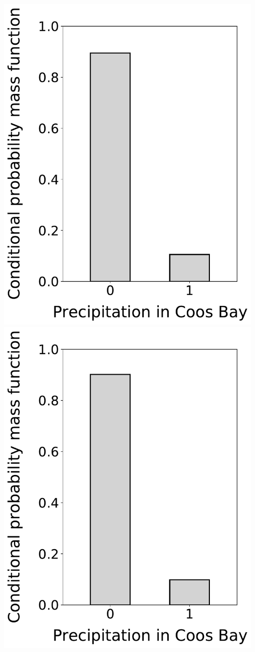 \documentclass[12pt,twoside]{article}
\begin{document}
\begin{enumerate}
\includegraphics[scale=.5]{precipitation_cond_pmf_2_given_1eq0.pdf}
\includegraphics[scale=.5]{precipitation_cond_pmf_2_given_1eq0_3eq0.pdf}

\end{enumerate}
\end{document}
